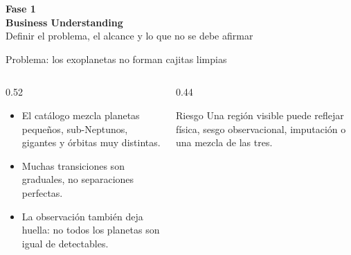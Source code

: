 \documentclass[aspectratio=169,10pt]{beamer}
\newcommand{\phasebox}[3]{
  \begin{center}
    \vspace{1.2em}
    {\Large\textbf{#1}}\\[0.5em]
    {\huge\textbf{#2}}\\[0.8em]
    {\large #3}
  \end{center}
}
\begin{document}
\begin{frame}[plain]
  \phasebox{Fase 1}{Business Understanding}{Definir el problema, el alcance y lo que no se debe afirmar}
\end{frame}

\begin{frame}{Problema: los exoplanetas no forman cajitas limpias}
  \begin{columns}[T,onlytextwidth]
    \begin{column}{0.52\textwidth}
      \begin{itemize}
        \item El cat\'alogo mezcla planetas peque\~nos, sub-Neptunos, gigantes y \'orbitas muy distintas.
        \item Muchas transiciones son graduales, no separaciones perfectas.
        \item La observaci\'on tambi\'en deja huella: no todos los planetas son igual de detectables.
      \end{itemize}
    \end{column}
    \begin{column}{0.44\textwidth}
      \begin{alertblock}{Riesgo}
        Una regi\'on visible puede reflejar f\'isica, sesgo observacional, imputaci\'on o una mezcla de las tres.
      \end{alertblock}
    \end{column}
  \end{columns}
\end{frame}
\end{document}

